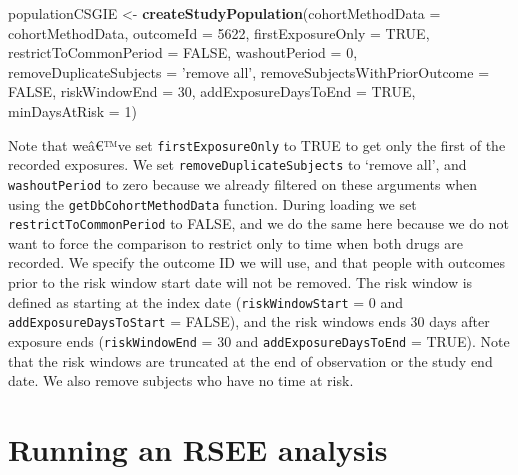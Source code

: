 \documentclass[]{article}
\newenvironment{Shaded}{\begin{snugshade}}{\end{snugshade}}
\newcommand{\DataTypeTok}[1]{\textcolor[rgb]{0.13,0.29,0.53}{#1}}
\newcommand{\DecValTok}[1]{\textcolor[rgb]{0.00,0.00,0.81}{#1}}
\newcommand{\KeywordTok}[1]{\textcolor[rgb]{0.13,0.29,0.53}{\textbf{#1}}}
\newcommand{\NormalTok}[1]{#1}
\newcommand{\OtherTok}[1]{\textcolor[rgb]{0.56,0.35,0.01}{#1}}
\newcommand{\StringTok}[1]{\textcolor[rgb]{0.31,0.60,0.02}{#1}}
\begin{document}
\begin{Shaded}
\begin{Highlighting}[]
\NormalTok{populationCSGIE <-}\StringTok{ }\KeywordTok{createStudyPopulation}\NormalTok{(}\DataTypeTok{cohortMethodData =}\NormalTok{ cohortMethodData,}
                                         \DataTypeTok{outcomeId =} \DecValTok{5622}\NormalTok{,}
                                         \DataTypeTok{firstExposureOnly =} \OtherTok{TRUE}\NormalTok{, }
                                         \DataTypeTok{restrictToCommonPeriod =} \OtherTok{FALSE}\NormalTok{,}
                                         \DataTypeTok{washoutPeriod =} \DecValTok{0}\NormalTok{, }
                                         \DataTypeTok{removeDuplicateSubjects =} \StringTok{'remove all'}\NormalTok{,}
                                         \DataTypeTok{removeSubjectsWithPriorOutcome =} \OtherTok{FALSE}\NormalTok{, }
                                         \DataTypeTok{riskWindowEnd =} \DecValTok{30}\NormalTok{,}
                                         \DataTypeTok{addExposureDaysToEnd =} \OtherTok{TRUE}\NormalTok{, }
                                         \DataTypeTok{minDaysAtRisk =} \DecValTok{1}\NormalTok{)}
\end{Highlighting}
\end{Shaded}

Note that weâ€™ve set \texttt{firstExposureOnly} to TRUE to get only the
first of the recorded exposures. We set \texttt{removeDuplicateSubjects}
to `remove all', and \texttt{washoutPeriod} to zero because we already
filtered on these arguments when using the
\texttt{getDbCohortMethodData} function. During loading we set
\texttt{restrictToCommonPeriod} to FALSE, and we do the same here
because we do not want to force the comparison to restrict only to time
when both drugs are recorded. We specify the outcome ID we will use, and
that people with outcomes prior to the risk window start date will not
be removed. The risk window is defined as starting at the index date
(\texttt{riskWindowStart} = 0 and \texttt{addExposureDaysToStart} =
FALSE), and the risk windows ends 30 days after exposure ends
(\texttt{riskWindowEnd} = 30 and \texttt{addExposureDaysToEnd} = TRUE).
Note that the risk windows are truncated at the end of observation or
the study end date. We also remove subjects who have no time at risk.

\hypertarget{running-an-rsee-analysis}{%
\section{Running an RSEE analysis}\label{running-an-rsee-analysis}}
\end{document}
